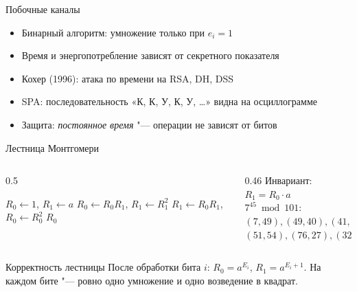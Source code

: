 \documentclass{ca-slides}
\begin{document}
\begin{canvasframe}{Побочные каналы}
  \begin{itemize}
    \item Бинарный алгоритм: умножение только при $e_i = 1$
    \item Время и энергопотребление зависят от секретного показателя
    \item Кохер (1996): атака по времени на RSA, DH, DSS
    \item SPA: последовательность «К, К, У, К, У, \dots» видна на осциллограмме
    \item Защита: \emph{постоянное время} "--- операции не зависят от битов
  \end{itemize}
  \penspace[0.25\textheight]
\end{canvasframe}

\begin{canvasframe}{Лестница Монтгомери}
  \begin{columns}[T]
    \begin{column}{0.5\textwidth}
      \begin{algorithmic}[1]
        \State $R_0 \gets 1$, $R_1 \gets a$
            \State $R_0 \gets R_0 R_1$, $R_1 \gets R_1^2$
          \Else
            \State $R_1 \gets R_0 R_1$, $R_0 \gets R_0^2$
          \EndIf
        \EndFor
        \State \Return $R_0$
      \end{algorithmic}
    \end{column}
    \begin{column}{0.46\textwidth}
      Инвариант: $R_1 = R_0 \cdot a$\\[1ex]
      $7^{45} \bmod 101$:\\
      $(7, 49), (49, 40), (41, 85),$\\
      $(51, 54), (76, 27), (32, 22)$
    \end{column}
  \end{columns}
\end{canvasframe}

\begin{theoremframe}{Корректность лестницы}
  После обработки бита $i$: $R_0 = a^{E_i}$, $R_1 = a^{E_i + 1}$. На каждом бите "--- ровно одно
  умножение и одно возведение в квадрат.
\end{theoremframe}
\end{document}
